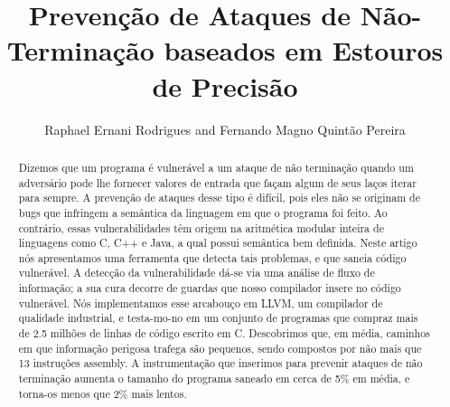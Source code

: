 \documentclass{llncs}
\begin{document}
\title{Prevenção de Ataques de Não-Terminação baseados em
Estouros de Precisão}

\author{Raphael Ernani Rodrigues and Fernando Magno Quintão Pereira}



\maketitle

\begin{abstract}
Dizemos que um programa é vulnerável a um ataque de não terminação quando
um adversário pode lhe fornecer valores de entrada que façam algum de seus laços 
iterar para sempre.
A prevenção de ataques desse tipo é difícil, pois eles não se originam de bugs 
que infringem a semântica da linguagem em que o programa foi feito.
Ao contrário, essas vulnerabilidades têm origem na aritmética modular inteira de 
linguagens como C, C++ e Java, a qual possui semântica bem definida.
Neste artigo nós apresentamos uma ferramenta que detecta tais problemas, 
e que saneia código vulnerável.
A detecção da vulnerabilidade dá-se via uma análise de fluxo de informação;
a sua cura decorre de guardas que nosso compilador insere no código vulnerável.
Nós implementamos esse arcabouço em LLVM, um compilador de qualidade industrial, 
e testa-mo-no em um conjunto de programas que compraz mais de
2.5 milhões de linhas de código escrito em C.
Descobrimos que, em média, caminhos em que informação perigosa trafega são 
pequenos, sendo compostos por não mais que 13 instruções assembly.
A instrumentação que inserimos para prevenir ataques de não terminação aumenta o 
tamanho do programa saneado em cerca de 5\% em média, e torna-os menos que 2\% 
mais lentos.
\end{abstract}
\end{document}
